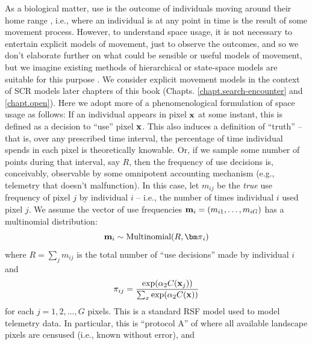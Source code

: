 As a biological matter, use is the outcome of individuals moving
around their home range \citep{hooten_etal:2010}, i.e., where an
individual is at any point in time is the result of some movement
process. However, to understand space usage, it is not necessary to
entertain explicit models of movement, just to observe the outcomes,
and so we don't elaborate further on what could be sensible or useful
models of movement, but we imagine existing methods of hierarchical or
state-space models are suitable for this purpose
\citep{ovaskainen:2004, jonsen_etal:2005, forester_etal:2007,
  ovaskainen_etal:2008, patterson_etal:2008, hooten_etal:2010,
  mcclintock_etal:2012}.  We consider explicit movement models in the
context of SCR models later chapters of this book
(Chapts. \ref{chapt.search-encounter} and \ref{chapt.open}).  Here we
adopt more of a phenomenological formulation of space usage as
follows: If an individual appears in pixel ${\bf x}$ at some instant,  
this is defined as a decision to ``use'' pixel ${\bf
  x}$. 
This also induces a definition of ``truth'' -- that is, over
any prescribed time interval, the percentage of time individual spends
in each pixel is theoretically knowable. Or, if we sample some number
of points during that interval, say $R$, 
then the frequency of use decisions is,
 conceivably, observable by some
omnipotent accounting mechanism (e.g., telemetry that doesn't malfunction).
In this
case, let $m_{ij}$ be the {\it true} use frequency of pixel $j$ by
individual $i$ -- i.e., the number of times individual $i$ used pixel
$j$.  We assume the vector of use frequencies ${\bf m}_{i} =
(m_{i1},\ldots,m_{iG})$ has a multinomial distribution:
\[
{\bf m}_{i} \sim \mbox{Multinomial}(R, {\bm \pi}_{i})
\]
where $R = \sum_{j} m_{ij}$ is the total number of ``use decisions''
made by individual $i$ and
\[
 \pi_{ij} = \frac{ \exp( \alpha_{2} C({\bf x}_{j}) ) }{ \sum_{x}
   \exp(\alpha_{2} C({\bf x}))}
\]
for each $j=1,2,\ldots,G$ pixels.
This is a standard RSF model \citep{manly_etal:2002} used to model
telemetry data. In particular, this is ``protocol A'' of
\citep{manly_etal:2002} where all available landscape pixels are censused (i.e., known without error), and
